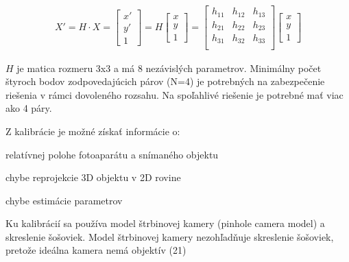 \begin{equation}
\label{eq_planar}
\begin{aligned}
X'=H \cdot X =
\begin{bmatrix}
x' \\ y' \\ 1 
\end{bmatrix}
= H
\begin{bmatrix}
x \\ y \\ 1 
\end{bmatrix} =
\begin{bmatrix}
h_{11} & h_{12} & h_{13}  \\
h_{21} & h_{22} & h_{23}  \\
h_{31} & h_{32} & h_{33}  \\
\end{bmatrix}
\begin{bmatrix}
x \\ y \\ 1 
\end{bmatrix}
\end{aligned}
\end{equation}

$H$ je  matica  rozmeru  3x3  a  má  8  nezávislých  parametrov.  Minimálny  počet štyroch  bodov zodpovedajúcich párov (N=4) je potrebných na zabezpečenie riešenia v rámci dovoleného rozsahu. Na spoľahlivé riešenie je potrebné mať viac ako 4 páry.



Z kalibrácie je možné získať informácie o:

\begin{description}[leftmargin=*,labelsep=5.8mm, font=$\bullet$~\normalfont\scshape\color{black}]
	\item relatívnej polohe fotoaparátu a snímaného objektu 
	\item chybe reprojekcie 3D objektu v 2D rovine 
	\item chybe estimácie parametrov
\end{description}

Ku kalibrácií sa používa model štrbinovej kamery (pinhole camera model) a skreslenie šošoviek. Model štrbinovej kamery nezohľadňuje skreslenie šošoviek, pretože ideálna kamera nemá objektív (21)



